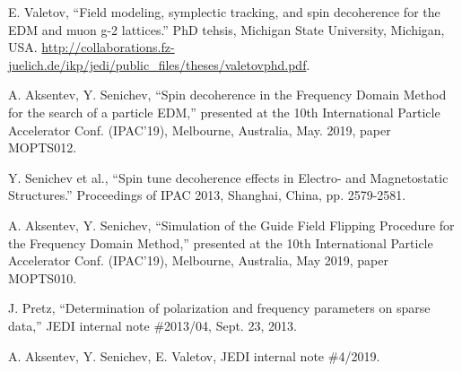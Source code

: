 \documentclass[]{elsarticle}
\begin{document}
\begin{thebibliography}{9}
  E. Valetov, ``Field modeling, symplectic tracking, and spin decoherence for the EDM and muon g-2 lattices.''
  PhD tehsis, Michigan State University, Michigan, USA.
  \url{http://collaborations.fz-juelich.de/ikp/jedi/public_files/theses/valetovphd.pdf}.

  A. Aksentev, Y. Senichev, ``Spin decoherence in the Frequency Domain Method for the search of a particle EDM,''
  presented at the 10th International Particle Accelerator Conf. (IPAC'19), Melbourne, Australia,
  May. 2019, paper MOPTS012.

  Y. Senichev et al., ``Spin tune decoherence effects in Electro- and Magnetostatic Structures.''
  Proceedings of IPAC 2013, Shanghai, China, pp. 2579-2581.

  A. Aksentev, Y. Senichev, ``Simulation of the Guide Field Flipping Procedure for the Frequency Domain Method,'' 
  presented at the 10th International Particle Accelerator Conf. (IPAC'19), Melbourne, Australia,
  May 2019, paper MOPTS010.

  J. Pretz, ``Determination of polarization and frequency parameters on sparse data,'' JEDI internal
  note \#2013/04, Sept. 23, 2013.
  
  A. Aksentev, Y. Senichev, E. Valetov, JEDI internal note \#4/2019.
  
\end{thebibliography}
\end{document}
